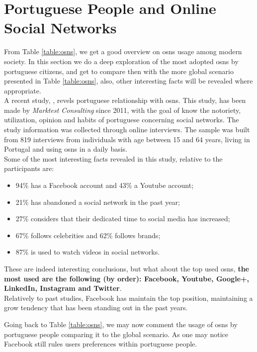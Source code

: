 \section{Portuguese People and Online Social Networks}
From Table \ref{table:osns}, we get a good overview on \glspl{osn} usage among modern society. In this section we do a deep exploration of the most adopted \glspl{osn} by portuguese citizens,
and get to compare then with the more global scenario presented in Table \ref{table:osns}, also, other interesting facts will be revealed where appropriate.\\
\indent A recent study, \citep{marktest2016}, revels portuguese relationship with \glspl{osn}. This study, has been made by \textit{Marktest Consulting} since 2011, with the goal of know the notoriety, utilization, opinion
and habits of portuguese concerning social networks. The study information was collected through online interviews. The sample was built from 819 interviews from individuals with age between
15 and 64 years, living in Portugal and using \glspl{osn} in a daily basis.\\
\indent Some of the most interesting facts revealed in this study, relative to the participants are:
\begin{itemize}
  \item 94\% has a Facebook account and 43\% a Youtube account;
  \item 21\% has abandoned a social network in the past year;
  \item 27\% considers that their dedicated time to social media has increased;
  \item 67\% follows celebrities and 62\% follows brands;
  \item 87\% is used to watch videos in social networks.
\end{itemize}

\indent These are indeed interesting conclusions, but what about the top used \glspl{osn}, \textbf{the most used are
the following (by order): Facebook, Youtube, Google+, LinkedIn, Instagram and Twitter}.\\
\indent Relatively to \citep{marktest2016} past studies, Facebook has maintain
the top position, maintaining a grow tendency that has been standing out in the past years.

\indent Going back to Table \ref{table:osns}, we may now comment the usage of \glspl{osn} by portuguese people comparing it
to the global scenario. As one may notice Facebook still rules users preferences within portuguese people.

